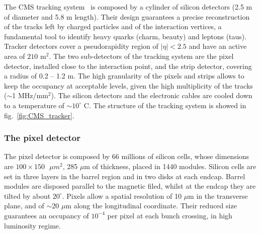 The CMS tracking system~\cite{Karimäki:368412,Chatrchyan:2014fea} is composed by a cylinder of silicon detectors (2.5 m of diameter and 5.8 m length). Their design guarantees a precise reconstruction of the tracks left by charged particles and of the interaction vertices, a fundamental tool to identify heavy quarks (charm, beauty) and leptons (taus).
Tracker detectors cover a pseudorapidity region of $|\eta|<2.5$ and have an active area of $210\text{ m}^2$. The two sub-detectors of the tracking system are the pixel detector, installed close to the interaction point, and the strip detector, covering a radius of 0.2 -- 1.2 m. The high granularity of the pixels and strips allows to keep the occupancy at acceptable levels, given the high multiplicity of the tracks ($\sim$1 MHz/$\text{mm}^2$). The silicon detectors and the electronic cables are cooled down to a temperature of $\sim 10^{\circ}$ C. The structure of the tracking system is showed in fig.~\ref{fig:CMS_tracker}.

\subsubsection{The pixel detector}
The pixel detector is composed by 66 millions of silicon cells, whose dimensions are $100 \times 150 \text{ }{\mu{m}}^2$, 285 $\mu$m of thickness, placed in 1440 modules. Silicon cells are set in three layers in the barrel region and in two disks at each endcap. Barrel modules are disposed parallel to the magnetic filed, whilst at the endcap they are tilted by about $20^{\circ}$. 
Pixels allow a spatial resolution of 10 $\mu$m in the transverse plane, and of $\sim$20 $\mu$m along the longitudinal coordinate. Their reduced size guarantees an occupancy of $10^{-4}$ per pixel at each bunch crossing, in high luminosity regime.

